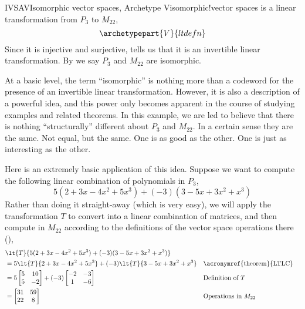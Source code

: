%
\begin{example}{IVSAV}{Isomorphic vector spaces, Archetype V}{isomorphic!vector spaces}
 is a linear transformation from $P_3$ to $M_{22}$,
%
\begin{equation*}
\archetypepart{V}{ltdefn}
\end{equation*}
%
Since it is injective and surjective,  tells us that it is an invertible linear transformation.  By  we say $P_3$ and $M_{22}$ are isomorphic.\par
%
At a basic level, the term ``isomorphic'' is nothing more than a codeword for the presence of an invertible linear transformation.  However, it is also a description of a powerful idea, and this power only becomes apparent in the course of studying examples and related theorems.  In this example, we are led to believe that there is nothing ``structurally'' different about $P_3$ and $M_{22}$.  In a certain sense they are the same.  Not equal, but the same.  One is as good as the other.  One is just as interesting as the other.\par
%
Here is an extremely basic application of this idea.  Suppose we want to compute the following linear combination of polynomials in $P_3$,
%
\begin{equation*}
5(2+3x-4x^2+5x^3)+(-3)(3-5x+3x^2+x^3)
\end{equation*}
%
Rather than doing it straight-away (which is very easy), we will apply the transformation $T$ to convert into a linear combination of matrices, and then compute in $M_{22}$ according to the definitions of the vector space operations there (),
%
\begin{align*}
%
&\lt{T}{5(2+3x-4x^2+5x^3)+(-3)(3-5x+3x^2+x^3)}\\
&=5\lt{T}{2+3x-4x^2+5x^3}+(-3)\lt{T}{3-5x+3x^2+x^3}&&\text{\acronymref{theorem}{LTLC}}\\
&=5
\begin{bmatrix}
5 & 10\\5 & -2
\end{bmatrix}
+(-3)
\begin{bmatrix}
-2 & -3\\1 & -6
\end{bmatrix}&&\text{Definition of $T$}\\
&=
\begin{bmatrix}
31 & 59\\22 & 8
\end{bmatrix}&&\text{Operations in $M_{22}$}

\end{align*}
\end{example}
